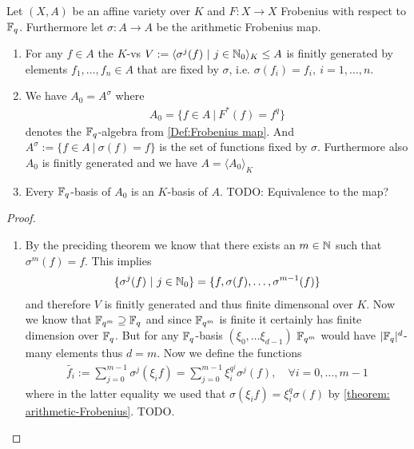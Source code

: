 \documentclass[]{article}
\begin{document}
\begin{lemma}
    Let \((X,A)\) be an affine variety over \(K\) and \(F:X \rightarrow X\) Frobenius with respect to \({\mathbb{F}}_q\).
    Furthermore let \(\sigma: A \rightarrow A\) be the arithmetic Frobenius map.
    \begin{enumerate}
        \item For any \(f \in A\) the \(K\)-vs \(V:=\langle \sigma^j(f) \ | \ j \in {\mathbb{N}}_0 \rangle_K \leq A\) 
        is finitly generated by elements \(f_1, \dots, f_n\in A\) that are fixed by \(\sigma\), i.e. \(\sigma(f_i)=f_i, \ i=1, \dots, n\).
        \item We have \(A_0=A^\sigma\) where 
        \begin{align*}
            A_0=\{f \in A \ | \ F^*(f)= f^q\}
        \end{align*}
        denotes the \({\mathbb{F}}_q\)-algebra from \ref{Def:Frobenius map}. And \(A^\sigma:=\{ f \in A \ | \ \sigma(f)=f\}\) is the set of functions fixed
        by \(\sigma\). Furthermore also \(A_0\) is finitly generated and we have \(A=\langle A_0 \rangle_K\)
        \item Every \({\mathbb{F}}_q\)-basis of \(A_0\) is an \(K\)-basis of \(A\). TODO: Equivalence to the map?
    \end{enumerate}
\end{lemma}
\begin{proof}
    \begin{enumerate}
        \item By the preciding theorem we know that there exists an \(m \in {\mathbb{N}}\) such that \(\sigma^m(f)=f\). This implies
        \begin{align*}
            \{\sigma^j(f)\ | \ j \in {\mathbb{N}}_0\} = \{f, \sigma(f), \dots, \sigma^{m-1}(f)\}
        \end{align*}
        and therefore \(V\) is finitly generated and thus finite dimensonal over \(K\). Now we know that \({\mathbb{F}}_{q^m} \supseteq {\mathbb{F}}_q\) and since
        \({\mathbb{F}}_{q^m}\) is finite it certainly has finite dimension over \({\mathbb{F}}_q\). But for any \({\mathbb{F}}_q\)-basis \((\xi_0, \dots \xi_{d-1})\) \({\mathbb{F}}_{q^m}\) would have
        \(|{\mathbb{F}}_q |^d\)-many elements thus \(d=m\). Now we define the functions
        \begin{align*}
            \tilde{f_i} := \sum_{j=0}^{m-1}\sigma^j(\xi_i f) = \sum_{j=0}^{m-1}\xi_i^{q^j} \sigma^j(f), \quad\forall i=0, \dots, m-1
        \end{align*}
        where in the latter equality we used that \(\sigma(\xi_i f) = \xi_i^q \sigma(f)\) by \ref{theorem: arithmetic-Frobenius}. TODO. 
    \end{enumerate}
\end{proof}
\end{document}

